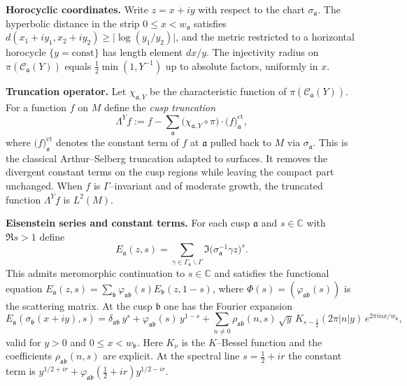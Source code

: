 \medskip
\noindent\textbf{Horocyclic coordinates.}
Write $z=x+iy$ with respect to the chart $\sigma_{\mathfrak{a}}$.
The hyperbolic distance in the strip $0\le x < w_{\mathfrak{a}}$ satisfies
$d(x_1+i y_1, x_2+i y_2) \ge \big|\log(y_1/y_2)\big|$,
and the metric restricted to a horizontal horocycle $\{y=\mathrm{const}\}$ has length element $dx/y$.
The injectivity radius on $\pi(\mathcal{C}_{\mathfrak{a}}(Y))$ equals $\frac{1}{2}\min(1,Y^{-1})$ up to absolute factors,
uniformly in $x$.

\medskip
\noindent\textbf{Truncation operator.}
Let $\chi_{\mathfrak{a},Y}$ be the characteristic function of $\pi(\mathcal{C}_{\mathfrak{a}}(Y))$.
For a function $f$ on $M$ define the \emph{cusp truncation}
\[
  \Lambda^{Y} f
  :=
  f
  - \sum_{\mathfrak{a}}
    \big(\chi_{\mathfrak{a},Y}\circ\pi\big)
    \cdot \big( f \big)_{\mathfrak{a}}^{\mathrm{ct}},
\]
where $\big( f \big)_{\mathfrak{a}}^{\mathrm{ct}}$ denotes the constant term of $f$ at $\mathfrak{a}$
pulled back to $M$ via $\sigma_{\mathfrak{a}}$.
This is the classical Arthur–Selberg truncation adapted to surfaces.
It removes the divergent constant terms on the cusp regions while leaving the compact part unchanged.
When $f$ is $\Gamma$–invariant and of moderate growth, the truncated function $\Lambda^{Y}f$ is $L^{2}(M)$.

\medskip
\noindent\textbf{Eisenstein series and constant terms.}
For each cusp $\mathfrak{a}$ and $s\in\mathbb{C}$ with $\Re s>1$ define
\[
  E_{\mathfrak{a}}(z,s)
  =
  \sum_{\gamma\in \Gamma_{\mathfrak{a}}\backslash\Gamma}
  \Im\!\big( \sigma_{\mathfrak{a}}^{-1}\gamma z \big)^{s}.
\]
This admits meromorphic continuation to $s\in\mathbb{C}$ and satisfies the functional equation
$E_{\mathfrak{a}}(z,s)=\sum_{\mathfrak{b}}\varphi_{\mathfrak{a}\mathfrak{b}}(s)E_{\mathfrak{b}}(z,1-s)$,
where $\Phi(s)=(\varphi_{\mathfrak{a}\mathfrak{b}}(s))$ is the scattering matrix.
At the cusp $\mathfrak{b}$ one has the Fourier expansion
\[
  E_{\mathfrak{a}}(\sigma_{\mathfrak{b}}(x+iy),s)
  =
  \delta_{\mathfrak{a}\mathfrak{b}}\,y^{s}
  +
  \varphi_{\mathfrak{a}\mathfrak{b}}(s)\,y^{1-s}
  +
  \sum_{n\neq 0} \rho_{\mathfrak{a}\mathfrak{b}}(n,s)\, \sqrt{y}\,K_{s-\frac12}(2\pi|n|y)\,e^{2\pi i n x/w_{\mathfrak{b}}},
\]
valid for $y>0$ and $0\le x < w_{\mathfrak{b}}$.
Here $K_{\nu}$ is the $K$–Bessel function and the coefficients $\rho_{\mathfrak{a}\mathfrak{b}}(n,s)$ are explicit.
At the spectral line $s=\tfrac12+ir$ the constant term is
$y^{1/2+ir}+\varphi_{\mathfrak{a}\mathfrak{b}}(\tfrac12+ir)y^{1/2-ir}$.

